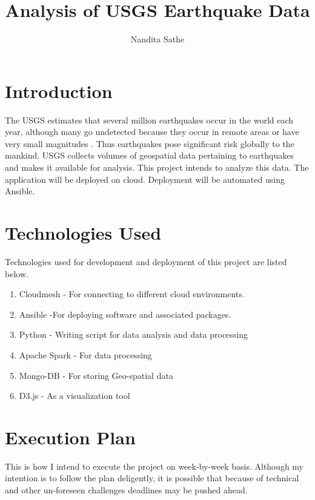 \documentclass[9pt,twocolumn,twoside]{../../styles/osajnl}
\title{Analysis of USGS Earthquake Data}
\author[1,*]{Nandita Sathe}
\affil[1]{School of Informatics and Computing, Bloomington, IN 47408, U.S.A.}
\affil[*]{Corresponding authors: nsathe@iu.edu}
\begin{document}
\maketitle

\section{Introduction}

The USGS estimates that several million earthquakes occur in the world each year, although many go undetected because they occur in remote areas or have very small magnitudes \cite{www-usgs2}. Thus earthquakes pose significant risk globally to the mankind. USGS collects volumes of geospatial data pertaining to earthquakes and makes it available for analysis. This project intends to analyze this data. The application will be deployed on cloud. Deployment will be automated using Ansible. 

\section{Technologies Used}

Technologies used for development and deployment of this project are listed below.
\begin{enumerate}

\item Cloudmesh - For connecting to different cloud environments.
\item Ansible -For deploying software and associated packages.
\item Python - Writing script for data analysis and data processing 
\item Apache Spark - For data processing
\item Mongo-DB - For storing Geo-spatial data
\item D3.js - As a visualization tool
\end{enumerate}

\section{Execution Plan}

This is how I intend to execute the project on week-by-week basis. Although my intention is to follow the plan deligently, it is possible that because of technical and other un-foreseen challenges deadlines may be pushed ahead.
\end{document}
